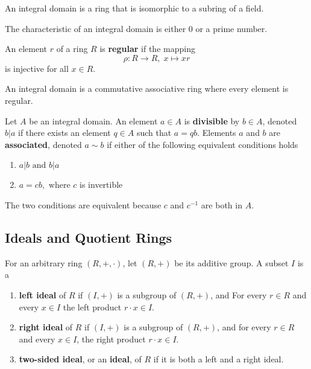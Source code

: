   \begin{proposition}
    An integral domain is a ring that is isomorphic to a subring of a field. 
  \end{proposition}

  \begin{proposition}
    The characteristic of an integral domain is either $0$ or a prime number. 
  \end{proposition}

  \begin{definition}
     An element $r$ of a ring $R$ is \textbf{regular} if the mapping 
     \begin{equation}
       \rho: R \longrightarrow R, \; x \mapsto x r
     \end{equation}
    is injective for all $x \in R$. 
  \end{definition}

  \begin{proposition}
    An integral domain is a commutative associative ring where every element is regular. 
  \end{proposition}

  \begin{definition}
    Let $A$ be an integral domain. An element $a \in A$ is \textbf{divisible} by $b \in A$, denoted $b | a$ if there exists an element $q \in A$ such that $a = q b$. Elements $a$ and $b$ are \textbf{associated}, denoted $a \sim b$ if either of the following equivalent conditions holds
    \begin{enumerate}
        \item $a | b \text{ and } b | a$
        \item $a = c b, \text{ where } c$ is invertible
    \end{enumerate}
    The two conditions are equivalent because $c$ and $c^{-1}$ are both in $A$. 
  \end{definition}

\subsection{Ideals and Quotient Rings}

  \begin{definition}[Ideals]
    For an arbitrary ring $(R,+, \cdot)$, let $(R, +)$ be its additive group. A subset $I$ is a 
    \begin{enumerate}
      \item \textbf{left ideal} of $R$ if $(I, +)$ is a subgroup of $(R, +)$, and For every $r \in R$ and every $x \in I$ the left product $r \cdot x \in I$. 
      \item \textbf{right ideal} of $R$ if $(I, +)$ is a subgroup of $(R, +)$, and for every $r \in R$ and every $x \in I$, the right product $r \cdot x \in I$. 
      \item \textbf{two-sided ideal}, or an \textbf{ideal}, of $R$ if it is both a left and a right ideal. 
    \end{enumerate}
  \end{definition}

